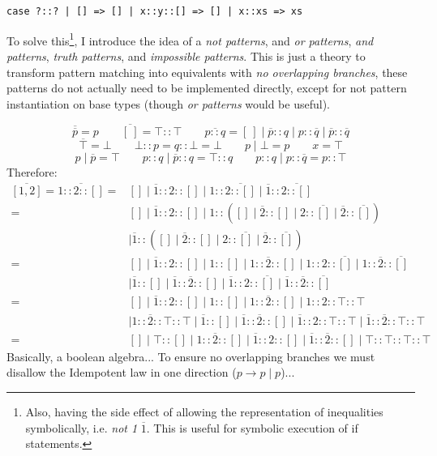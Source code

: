 \texttt{case ?::? | [] => [] | x::y::[] => [] | x::xs => xs}

To solve this\footnote{Also, having the side effect of allowing the representation of inequalities symbolically, i.e. \textit{not 1} $\overline{1}$. This is useful for symbolic execution of if statements.}, I introduce the idea of a \textit{not patterns}, and \textit{or patterns}, \textit{and patterns}, \textit{truth patterns}, and \textit{impossible patterns}. This is just a theory to transform pattern matching into equivalents with \textit{no overlapping branches}, these patterns do not actually need to be implemented directly, except for not pattern instantiation on base types (though \textit{or patterns} would be useful).

\[\overline{\overline{p}} = p \qquad \overline{[\ ]} = \top::\top \qquad \overline{p :: q} = [\ ] \mid \overline{p}::q \mid p::\overline{q} \mid \overline{p} :: \overline{q}\]
\[\overline{\top} = \bot \qquad \bot :: p = q :: \bot = \bot \qquad p \mid \bot = p \qquad x = \top\]
\[ p \mid \overline{p} = \top \qquad p :: q \mid \overline{p} :: q = \top ::q \qquad p :: q \mid p :: \overline{q} = p::\top\]
Therefore: 
{\tiny
\begin{align*}
\overline{[1,2]} = \overline{1::2::[]} = &[] \mid \overline{1} :: 2::[] \mid 1 :: \overline{2 :: []} \mid \overline{1} :: \overline{2::[]}\\
= &[] \mid \overline{1} :: 2::[] \mid 1 :: ([] \mid \overline{2} :: [] \mid 2 :: \overline{[]} \mid \overline{2} :: \overline{[]}) \\
&\mid \overline{1} :: ([] \mid \overline{2} :: [] \mid 2 :: \overline{[]} \mid \overline{2} :: \overline{[]})\\
= &[] \mid \overline{1} :: 2::[] \mid 1 :: [] \mid 1 :: \overline{2} :: [] \mid 1::2 :: \overline{[]} \mid 1::\overline{2} :: \overline{[]}\\
&\mid \overline{1} :: [] \mid \overline{1} ::\overline{2} :: [] \mid \overline{1} ::2 :: \overline{[]} \mid \overline{1} ::\overline{2} :: \overline{[]}\\
= &[] \mid \overline{1} :: 2::[] \mid 1 :: [] \mid 1 :: \overline{2} :: [] \mid 1::2 :: \top::\top\\
&\mid 1::\overline{2} :: \top::\top \mid \overline{1} :: [] \mid \overline{1} ::\overline{2} :: [] \mid \overline{1} ::2 :: \top::\top \mid \overline{1} ::\overline{2} :: \top :: \top\\
= &[] \mid \top::[] \mid 1::\overline{2}::[] \mid \overline{1}::2::[] \mid \overline{1}::\overline{2}::[] \mid \top::\top::\top::\top
\end{align*}
}
Basically, a boolean algebra... To ensure no overlapping branches we must disallow the Idempotent law in one direction ($p \to p \mid p$)...

